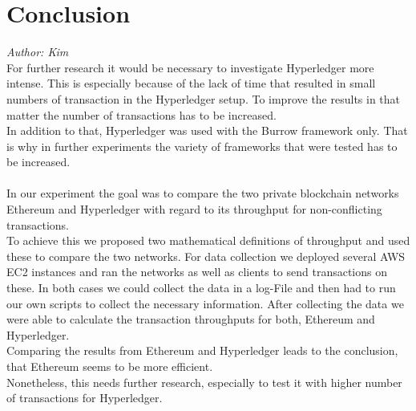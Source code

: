 \section{Conclusion}
\textit{Author: Kim}\\
For further research it would be necessary to investigate Hyperledger more intense. This is especially because of the lack of time that resulted in small numbers of transaction in the Hyperledger setup. To improve the results in that matter the number of transactions has to be increased.\\
In addition to that, Hyperledger was used with the Burrow framework only. That is why in further experiments the variety of frameworks that were tested has to be increased.\\
\\
In our experiment the goal was to compare the two private blockchain networks Ethereum and Hyperledger with regard to its throughput for non-conflicting transactions.\\
To achieve this we proposed two mathematical definitions of throughput and used these to compare the two networks. For data collection we deployed several AWS EC2 instances and ran the networks as well as clients to send transactions on these. In both cases we could collect the data in a log-File and then had to run our own scripts to collect the necessary information. After collecting the data we were able to calculate the transaction throughputs for both, Ethereum and Hyperledger.\\
Comparing the results from Ethereum and Hyperledger leads to the conclusion, that Ethereum seems to be more efficient. \\
Nonetheless, this needs further research, especially to test it with higher number of transactions for Hyperledger.